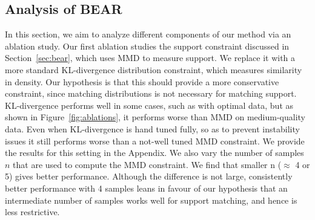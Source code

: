 
\iffalse

\vspace{-5pt}
\subsection{Analysis of BEAR}
\label{subsec:ablations}
In this section, we aim to analyze different components of our method via an ablation study. Our first ablation studies the support constraint discussed in Section~\ref{sec:bear}, which uses MMD to measure support. We replace it with a more standard KL-divergence distribution constraint, which measures similarity in density. 
Our hypothesis is that this should provide a more conservative constraint, since matching distributions is not necessary for matching support. KL-divergence performs well in some cases, such as with optimal data, but as shown in Figure~\ref{fig:ablations}, it performs worse than MMD on medium-quality data. Even when KL-divergence is hand tuned fully, so as to prevent instability issues it still performs worse than a not-well tuned MMD constraint. We provide the results for this setting in the Appendix. We also vary the number of samples $n$ that are used to compute the MMD constraint. We find that smaller n ($\approx$ 4 or 5) gives better performance. Although the difference is not large, consistently better performance with 4 samples leans in favour of our hypothesis that an intermediate number of samples works well for support matching, and hence is less restrictive.

